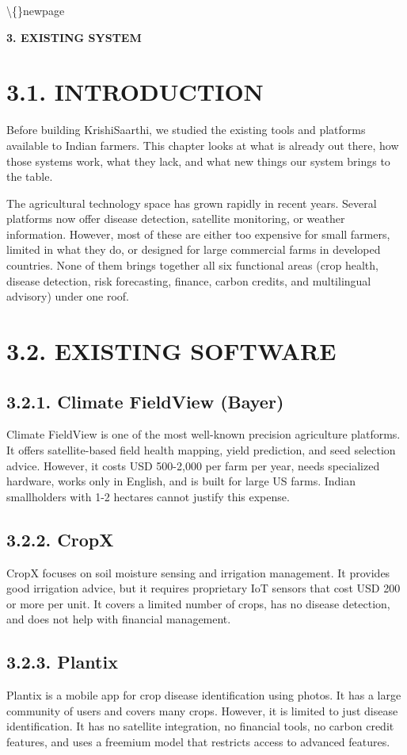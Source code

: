 \documentclass[12pt, a4paper]{report}
\begin{document}
\textbackslash\{\}newpage

\begin{center}
{\fontsize{14}{17}\bfseries 3. EXISTING SYSTEM}\\
\end{center}
\section{3.1. INTRODUCTION}
Before building KrishiSaarthi, we studied the existing tools and platforms available to Indian farmers. This chapter looks at what is already out there, how those systems work, what they lack, and what new things our system brings to the table.

The agricultural technology space has grown rapidly in recent years. Several platforms now offer disease detection, satellite monitoring, or weather information. However, most of these are either too expensive for small farmers, limited in what they do, or designed for large commercial farms in developed countries. None of them brings together all six functional areas (crop health, disease detection, risk forecasting, finance, carbon credits, and multilingual advisory) under one roof.

\section{3.2. EXISTING SOFTWARE}
\subsection{3.2.1. Climate FieldView (Bayer)}
Climate FieldView is one of the most well-known precision agriculture platforms. It offers satellite-based field health mapping, yield prediction, and seed selection advice. However, it costs USD 500-2,000 per farm per year, needs specialized hardware, works only in English, and is built for large US farms. Indian smallholders with 1-2 hectares cannot justify this expense.

\subsection{3.2.2. CropX}
CropX focuses on soil moisture sensing and irrigation management. It provides good irrigation advice, but it requires proprietary IoT sensors that cost USD 200 or more per unit. It covers a limited number of crops, has no disease detection, and does not help with financial management.

\subsection{3.2.3. Plantix}
Plantix is a mobile app for crop disease identification using photos. It has a large community of users and covers many crops. However, it is limited to just disease identification. It has no satellite integration, no financial tools, no carbon credit features, and uses a freemium model that restricts access to advanced features.
\end{document}
